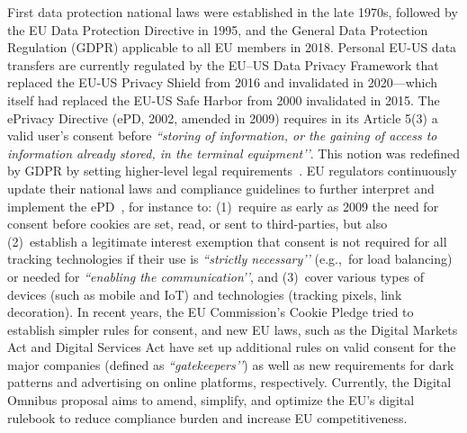 \label{sec:eu-regulations}
%
First data protection national laws were established in the late 1970s, followed by the EU Data Protection Directive in 1995, and the General Data Protection Regulation (GDPR) applicable to all EU members in 2018.
%
Personal EU-US data transfers are currently regulated by the EU–US Data Privacy Framework that replaced the EU-US Privacy Shield from 2016 and invalidated in 2020---which itself had replaced the EU-US Safe Harbor from 2000 invalidated in 2015.
%
The ePrivacy Directive (ePD, 2002, amended in 2009) requires in its Article 5(3) a valid user’s consent before \textit{``storing of information, or the gaining of access to information already stored, in the terminal equipment’’}.
This notion was redefined by GDPR by setting higher-level legal requirements~\cite{santosAreCookieBanners2020}.
%
EU regulators continuously update their national laws and compliance guidelines to further interpret and implement the ePD~\cite{Bielova2024-zr}, for instance to: (1)~require as early as 2009 the need for consent before cookies are set, read, or sent to third-parties, but also (2)~establish a legitimate interest exemption that consent is not required for all tracking technologies if their use is \textit{``strictly necessary’’} (e.g.,~for load balancing) or needed for \textit{``enabling the communication’’}, and (3)~cover various types of devices (such as mobile and IoT) and technologies (tracking pixels, link decoration).
%
In recent years, the EU Commission’s Cookie Pledge tried to establish simpler rules for consent, and new EU laws, such as the Digital Markets Act and Digital Services Act have set up additional rules on valid consent for the major companies (defined as \textit{``gatekeepers’’}) as well as new requirements for dark patterns and advertising on online platforms, respectively.
%
Currently, the Digital Omnibus proposal aims to amend, simplify, and optimize the EU's digital rulebook to reduce compliance burden and increase EU competitiveness.


